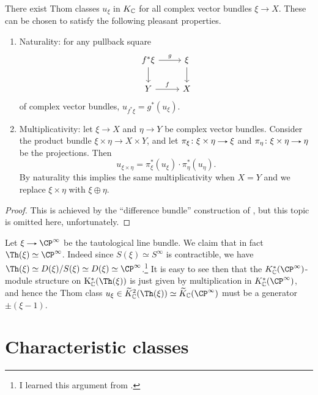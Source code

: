\begin{proposition}
  \label{thom-K}
  There exist Thom classes $u_\xi$ in $K_{\mathbb{C}}$ for all complex vector
  bundles $\xi \to X$. These can be chosen to satisfy the following
  pleasant properties.
  \begin{enumerate}
  \item Naturality: for any pullback square
    \[
    \begin{tikzcd}
      f^*\xi \rar{g} \dar & \xi \dar \\ Y \rar{f} & X
    \end{tikzcd}
    \]
    of complex vector bundles, $u_{f^*\xi} = g^*(u_\xi)$.
  \item Multiplicativity: let $\xi \to X$ and $\eta \to Y$ be complex
    vector bundles. Consider the product bundle $\xi \times \eta \to X
    \times Y$, and let $\pi_\xi \c \xi \times \eta \to \xi$ and
    $\pi_\eta \c \xi \times \eta \to \eta$ be the projections. Then
    \[
    u_{\xi \times \eta} = \pi_\xi^*(u_\xi) \cdot \pi_\eta^*(u_\eta).
    \]
    By naturality this implies the same multiplicativity when $X=Y$
    and we replace $\xi \times \eta$ with $\xi \oplus \eta$.
  \end{enumerate}
\end{proposition}

\begin{proof}
  This is achieved by the ``difference bundle'' construction of
  \cite{abs-clifford}, but this topic is omitted here, unfortunately.
\end{proof}

\begin{example}
  \label{taut-thom}
  Let $\xi \to \CP^\infty$ be the tautological line bundle. We claim
  that in fact $\Th(\xi) \simeq \CP^\infty$. Indeed since $S(\xi)
  \simeq S^\infty$ is contractible, we have $\Th(\xi) \simeq
  D(\xi)/S(\xi) \simeq D(\xi) \simeq \CP^\infty$.\footnote{I learned
    this argument from \cite{may-mu1}.} It is easy to see then that
  the $K_\C^*(\CP^{\infty})$-module structure on $\K^*_\C(\Th(\xi))$
  is just given by multiplication in $K_\C^*(\CP^{\infty})$, and
  hence the Thom class $u_\xi \in \til K_\C^2(\Th(\xi)) \simeq
  \til K_\C(\CP^\infty)$ must be a generator $\pm(\xi-1)$.
\end{example}


\section{Characteristic classes}

